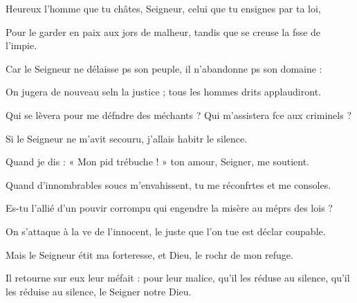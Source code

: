 \item Heureux l’homme que tu châtes, Seigneur,\psstar{} celui que tu ensignes par ta loi,
\item Pour le garder en paix aux jors de malheur,\psstar{} tandis que se creuse la fsse de l’impie.
\item Car le Seigneur ne délaisse ps son peuple,\psstar{} il n’abandonne ps son domaine :
\item On jugera de nouveau seln la justice ;\psstar{} tous les hommes drits applaudiront.
\item Qui se lèvera pour me défndre des méchants ?\psstar{} Qui m’assistera fce aux criminels ?
\item Si le Seigneur ne m’avit secouru,\psstar{} j’allais habitr le silence.
\item Quand je dis : « Mon pid trébuche ! »\psstar{} ton amour, Seigner, me soutient.
\item Quand d’innombrables soucs m’envahissent,\psstar{} tu me réconfrtes et me consoles.
\item Es-tu l’allié d’un pouvir corrompu\psstar{} qui engendre la misère au méprs des lois ?
\item On s’attaque à la ve de l’innocent,\psstar{} le juste que l’on tue est déclar coupable.
\item Mais le Seigneur étit ma forteresse,\psstar{} et Dieu, le rochr de mon refuge.
\item Il retourne sur eux leur méfait :\pscross{} pour leur malice, qu’il les réduse au silence,\psstar{} qu’il les réduise au silence, le Seigner notre Dieu.
